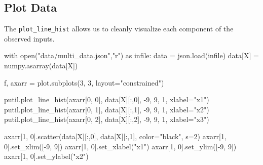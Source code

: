 \documentclass[
  letterpaper,
  DIV=11,
  numbers=noendperiod]{scrartcl}
\newenvironment{Shaded}{\begin{snugshade}}{\end{snugshade}}
\newcommand{\BuiltInTok}[1]{\textcolor[rgb]{0.00,0.23,0.31}{#1}}
\newcommand{\ControlFlowTok}[1]{\textcolor[rgb]{0.00,0.23,0.31}{#1}}
\newcommand{\DecValTok}[1]{\textcolor[rgb]{0.68,0.00,0.00}{#1}}
\newcommand{\ImportTok}[1]{\textcolor[rgb]{0.00,0.46,0.62}{#1}}
\newcommand{\NormalTok}[1]{\textcolor[rgb]{0.00,0.23,0.31}{#1}}
\newcommand{\OperatorTok}[1]{\textcolor[rgb]{0.37,0.37,0.37}{#1}}
\newcommand{\StringTok}[1]{\textcolor[rgb]{0.13,0.47,0.30}{#1}}
\begin{document}
\subsection{Plot Data}\label{plot-data}

The \texttt{plot\_line\_hist} allows us to cleanly visualize each
component of the observed inputs.

\begin{Shaded}
\begin{Highlighting}[]
\ControlFlowTok{with} \BuiltInTok{open}\NormalTok{(}\StringTok{"data/multi\_data.json"}\NormalTok{,}\StringTok{"r"}\NormalTok{) }\ImportTok{as}\NormalTok{ infile:}
\NormalTok{  data }\OperatorTok{=}\NormalTok{ json.load(infile)}
\NormalTok{data[}\StringTok{\textquotesingle{}X\textquotesingle{}}\NormalTok{] }\OperatorTok{=}\NormalTok{ numpy.asarray(data[}\StringTok{\textquotesingle{}X\textquotesingle{}}\NormalTok{])}


\NormalTok{f, axarr }\OperatorTok{=}\NormalTok{ plot.subplots(}\DecValTok{3}\NormalTok{, }\DecValTok{3}\NormalTok{, layout}\OperatorTok{=}\StringTok{"constrained"}\NormalTok{)}

\NormalTok{putil.plot\_line\_hist(axarr[}\DecValTok{0}\NormalTok{, }\DecValTok{0}\NormalTok{], data[}\StringTok{\textquotesingle{}X\textquotesingle{}}\NormalTok{][:,}\DecValTok{0}\NormalTok{], }\OperatorTok{{-}}\DecValTok{9}\NormalTok{, }\DecValTok{9}\NormalTok{, }\DecValTok{1}\NormalTok{, xlabel}\OperatorTok{=}\StringTok{"x1"}\NormalTok{)}
\NormalTok{putil.plot\_line\_hist(axarr[}\DecValTok{0}\NormalTok{, }\DecValTok{1}\NormalTok{], data[}\StringTok{\textquotesingle{}X\textquotesingle{}}\NormalTok{][:,}\DecValTok{1}\NormalTok{], }\OperatorTok{{-}}\DecValTok{9}\NormalTok{, }\DecValTok{9}\NormalTok{, }\DecValTok{1}\NormalTok{, xlabel}\OperatorTok{=}\StringTok{"x2"}\NormalTok{)}
\NormalTok{putil.plot\_line\_hist(axarr[}\DecValTok{0}\NormalTok{, }\DecValTok{2}\NormalTok{], data[}\StringTok{\textquotesingle{}X\textquotesingle{}}\NormalTok{][:,}\DecValTok{2}\NormalTok{], }\OperatorTok{{-}}\DecValTok{9}\NormalTok{, }\DecValTok{9}\NormalTok{, }\DecValTok{1}\NormalTok{, xlabel}\OperatorTok{=}\StringTok{"x3"}\NormalTok{)}

\NormalTok{axarr[}\DecValTok{1}\NormalTok{, }\DecValTok{0}\NormalTok{].scatter(data[}\StringTok{\textquotesingle{}X\textquotesingle{}}\NormalTok{][:,}\DecValTok{0}\NormalTok{], data[}\StringTok{\textquotesingle{}X\textquotesingle{}}\NormalTok{][:,}\DecValTok{1}\NormalTok{], color}\OperatorTok{=}\StringTok{"black"}\NormalTok{, s}\OperatorTok{=}\DecValTok{2}\NormalTok{)}
\NormalTok{axarr[}\DecValTok{1}\NormalTok{, }\DecValTok{0}\NormalTok{].set\_xlim([}\OperatorTok{{-}}\DecValTok{9}\NormalTok{, }\DecValTok{9}\NormalTok{])}
\NormalTok{axarr[}\DecValTok{1}\NormalTok{, }\DecValTok{0}\NormalTok{].set\_xlabel(}\StringTok{"x1"}\NormalTok{)}
\NormalTok{axarr[}\DecValTok{1}\NormalTok{, }\DecValTok{0}\NormalTok{].set\_ylim([}\OperatorTok{{-}}\DecValTok{9}\NormalTok{, }\DecValTok{9}\NormalTok{])}
\NormalTok{axarr[}\DecValTok{1}\NormalTok{, }\DecValTok{0}\NormalTok{].set\_ylabel(}\StringTok{"x2"}\NormalTok{)}


\end{Highlighting}
\end{Shaded}
\end{document}
